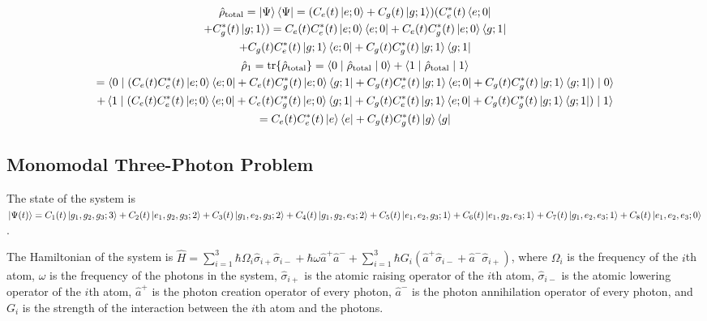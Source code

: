 \documentclass{article}
\theoremstyle{definition}
\begin{document}
\begin{gather*}
\hat{\rho}_{\text{total}} = \ket{\Psi}\bra{\Psi} = (C_{e}(t)\ket{e; 0} + C_{g}(t)\ket{g; 1})(C_{e}^{*}(t)\bra{e; 0}\\
 + C_{g}^{*}(t)\ket{g; 1}) = C_{e}(t)C_{e}^{*}(t)\ket{e; 0}\bra{e; 0} + C_{e}(t)C_{g}^{*}(t)\ket{e; 0}\bra{g; 1}\\
 + C_{g}(t)C_{e}^{*}(t)\ket{g; 1}\bra{e; 0} + C_{g}(t)C_{g}^{*}(t)\ket{g; 1}\bra{g; 1}\\
\hat{\rho}_{1} = \mathrm{tr}\{ \hat{\rho}_{\text{total}} \} = \braket{0 \mid \hat{\rho}_{\text{total}} \mid 0} + \braket{1 \mid \hat{\rho}_{\text{total}} \mid 1}\\
 = \braket{0 \mid (C_{e}(t)C_{e}^{*}(t)\ket{e; 0}\bra{e; 0} + C_{e}(t)C_{g}^{*}(t)\ket{e; 0}\bra{g; 1} + C_{g}(t)C_{e}^{*}(t)\ket{g; 1}\bra{e; 0} + C_{g}(t)C_{g}^{*}(t)\ket{g; 1}\bra{g; 1}) \mid 0}\\
  + \braket{1 \mid (C_{e}(t)C_{e}^{*}(t)\ket{e; 0}\bra{e; 0} + C_{e}(t)C_{g}^{*}(t)\ket{e; 0}\bra{g; 1} + C_{g}(t)C_{e}^{*}(t)\ket{g; 1}\bra{e; 0} + C_{g}(t)C_{g}^{*}(t)\ket{g; 1}\bra{g; 1}) \mid 1}\\
  = C_{e}(t)C_{e}^{*}(t)\ket{e}\bra{e} + C_{g}(t)C_{g}^{*}(t)\ket{g}\bra{g}
\end{gather*}

\subsection{Monomodal Three-Photon Problem}

The state of the system is $\ket{\Psi(t)} = C_{1}(t) \ket{g_{1}, g_{2}, g_{3}; 3} + C_{2}(t) \ket{e_{1}, g_{2}, g_{3}; 2} + C_{3}(t) \ket{g_{1}, e_{2}, g_{3}; 2} + C_{4}(t) \ket{g_{1}, g_{2}, e_{3}; 2} + C_{5}(t) \ket{e_{1}, e_{2}, g_{3}; 1} + C_{6}(t) \ket{e_{1}, g_{2}, e_{3}; 1} + C_{7}(t) \ket{g_{1}, e_{2}, e_{3}; 1} + C_{8}(t) \ket{e_{1}, e_{2}, e_{3}; 0}$.

The Hamiltonian of the system is $\hat{H} = \sum_{i = 1}^{3} \hbar \Omega_{i} \hat{\sigma}_{i+}\hat{\sigma}_{i-} + \hbar \omega \hat{a}^{+}\hat{a}^{-} + \sum_{i = 1}^{3} \hbar G_{i} (\hat{a}^{+}\hat{\sigma}_{i-} + \hat{a}^{-}\hat{\sigma}_{i+})$, where $\Omega_{i}$ is the frequency of the $i$th atom, $\omega$ is the frequency of the photons in the system, $\hat{\sigma}_{i+}$ is the atomic raising operator of the $i$th atom, $\hat{\sigma}_{i-}$ is the atomic lowering operator of the $i$th atom, $\hat{a}^{+}$ is the photon creation operator of every photon, $\hat{a}^{-}$ is the photon annihilation operator of every photon, and $G_{i}$ is the strength of the interaction between the $i$th atom and the photons.
\end{document}
